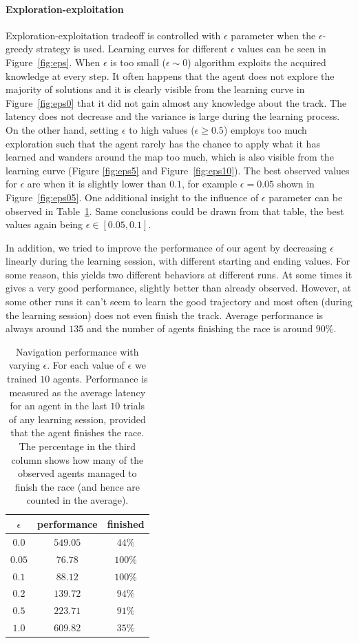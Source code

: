 \paragraph{Exploration-exploitation}
Exploration-exploitation tradeoff is controlled with $\epsilon$ parameter when
the $\epsilon$-greedy strategy is used. Learning curves for different $\epsilon$
values can be seen in Figure~\ref{fig:eps}. When $\epsilon$ is too small
($\epsilon \sim 0$) algorithm exploits the acquired knowledge at every step. It
often happens that the agent does not explore the majority of solutions and it
is clearly visible from the learning curve in Figure~\ref{fig:eps0} that it did
not gain almost any knowledge about the track. The latency does not decrease and
the variance is large during the learning process. On the other hand, setting
$\epsilon$ to high values ($\epsilon \ge 0.5$) employs too much exploration such
that the agent rarely has the chance to apply what it has learned and wanders
around the map too much, which is also visible from the learning curve
(Figure \ref{fig:eps5} and Figure~\ref{fig:eps10}). The best observed values for
$\epsilon$ are when it is slightly lower than $0.1$, for example $\epsilon =
0.05$ shown in Figure~\ref{fig:eps05}.  One additional insight to the influence
of $\epsilon$ parameter can be observed in Table~\ref{tab:perf}. Same
conclusions could be drawn from that table, the best values again being
$\epsilon \in [0.05, 0.1]$.

In addition, we tried to improve the performance of our agent by decreasing
$\epsilon$ linearly during the learning session, with different starting and
ending values. For some reason, this yields two different behaviors at different
runs. At some times it gives a very good performance, slightly better than
already observed. However, at some other runs it can't seem to learn the good
trajectory and most often (during the learning session) does not even finish the
track. Average performance is always around $135$ and the number of agents
finishing the race is around $90\%$.

\begin{table}[h!]
\centering
\begin{tabular}{|c|c|c|}
\hline
$\epsilon$ & performance & finished \\
\hline
$0.0$ & $549.05$ & $44\%$\\
\hline
$0.05$ & $76.78$ & $100\%$ \\
\hline
$0.1$ & $88.12$ & $100\%$ \\
\hline
$0.2$ & $139.72$ & $94\%$ \\
\hline
$0.5$ & $223.71$ & $91\%$ \\
\hline
$1.0$ & $609.82$ & $35\%$ \\
\hline
\end{tabular}
\caption{\label{tab:perf}Navigation performance with varying
$\epsilon$. For each value of $\epsilon$ we trained $10$ agents. Performance is
measured as the average latency for an agent in the last $10$ trials of any learning
session, provided that the agent finishes the race. The percentage in the third
column shows how many of the observed agents managed to finish the race (and
hence are counted in the average).}
\end{table}

